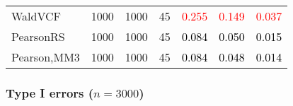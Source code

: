 \documentclass[
]{article}
\begin{document}
\begin{table}[H]
{\begin{tabular}[t]{lrrrrrr}
\hspace{1em}WaldVCF & 1000 & 1000 & 45 & \textcolor{red}{0.255} & \textcolor{red}{0.149} & \textcolor{red}{0.037}\\
\hspace{1em}PearsonRS & 1000 & 1000 & 45 & \textcolor{black}{0.084} & \textcolor{black}{0.050} & \textcolor{black}{0.015}\\
\hspace{1em}Pearson,MM3 & 1000 & 1000 & 45 & \textcolor{black}{0.084} & \textcolor{black}{0.048} & \textcolor{black}{0.014}\\
\bottomrule
\end{tabular}}
\endgroup{}
\end{table}

\hypertarget{type-i-errors-n3000-1}{%
\subsubsection{\texorpdfstring{Type I errors
(\(n=3000\))}{Type I errors (n=3000)}}\label{type-i-errors-n3000-1}}
\end{document}
